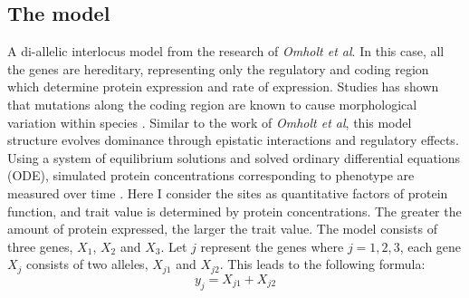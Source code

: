\subsection{The model}
A di-allelic interlocus model from the research of \textit{Omholt et al}. In this case, all the genes are hereditary, representing only the regulatory and coding region which determine protein expression and rate of expression. Studies has shown that mutations along the coding region are known to cause morphological variation within species \cite{stern2009genetic}. Similar to the work of \textit{Omholt et al}, this model structure evolves dominance through epistatic interactions and regulatory effects. Using a system of equilibrium solutions and solved ordinary differential equations (ODE), simulated protein concentrations corresponding to phenotype are measured over time \cite{omholt2000gene}. Here I consider the sites as quantitative factors of protein function, and trait value is determined by protein concentrations. The greater the amount of protein expressed, the larger the trait value. The model consists of three genes, $X_1$, $X_2$ and $X_3$. Let \(j\) represent the genes where $j = {1,2,3}$, each gene $X_j$ consists of two alleles, $X_{j1}$ and $X_{j2}$. This leads to the following formula:
\begin{equation*}
    y_j = X_{j1}  + X_{j2} \label{eq:Protein Expression} \tag{1}
\end{equation*}

